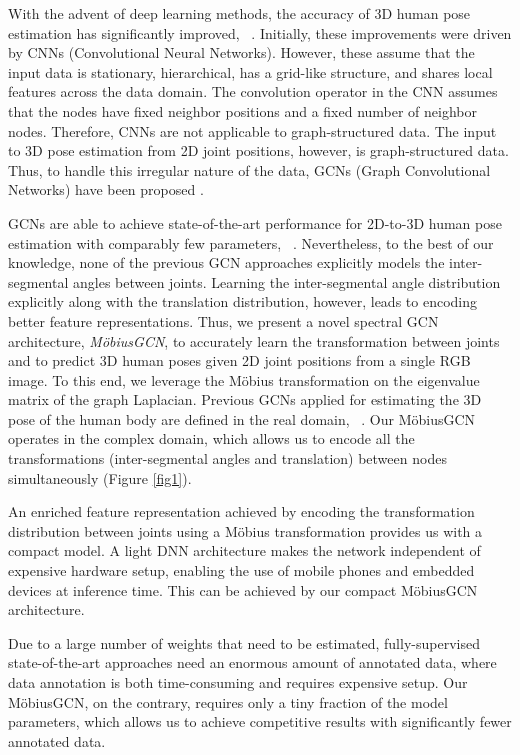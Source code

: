 \documentclass[runningheads]{llncs}
\begin{document}
With the advent of deep learning methods, the accuracy of 3D human pose estimation has significantly improved, \eg~\cite{martinez2017simple, pavllo20193d}. Initially, these improvements were driven by CNNs (Convolutional Neural Networks). 
However, these assume that the input data is stationary, hierarchical, has a grid-like structure, and shares local features across the data domain. The convolution operator in the CNN assumes that the nodes have fixed neighbor positions and a fixed number of neighbor nodes. Therefore, CNNs are not applicable to graph-structured data. The input to 3D pose estimation from 2D joint positions, however, is graph-structured data. Thus, to handle this irregular nature of the data, GCNs  (Graph Convolutional Networks) have been proposed \cite{bronstein2017geometric}.

GCNs are able to achieve state-of-the-art performance for 2D-to-3D human pose estimation with comparably few parameters, \eg~\cite{zhaoCVPR19semantic}. Nevertheless, to the best of our knowledge, none of the previous GCN approaches explicitly models the inter-segmental angles between joints. 
Learning the inter-segmental angle distribution explicitly along with the translation distribution, however, leads to encoding better feature representations.
Thus, we present a novel spectral GCN architecture, \emph{M\"obiusGCN}, to accurately learn the transformation between joints and to predict 3D human poses given 2D joint positions from a single RGB image. To this end, we leverage the M\"obius transformation on the eigenvalue matrix of the graph Laplacian. Previous GCNs applied for estimating the 3D pose of the human body are defined in the real domain, \eg~\cite{zhaoCVPR19semantic}.
Our M\"obiusGCN operates in the complex domain, which allows us to encode all the transformations (\ie inter-segmental angles and translation) between nodes simultaneously (Figure \ref{fig1}). 

An enriched feature representation achieved by encoding the transformation distribution between joints using a M\"obius transformation provides us with a compact model. A light DNN architecture makes the network independent of expensive hardware setup, enabling the use of mobile phones and embedded devices at inference time. This can be achieved by our compact M\"obiusGCN architecture.

Due to a large number of weights that need to be estimated, fully-supervised state-of-the-art approaches need an enormous amount of annotated data, where data annotation is both time-consuming and requires expensive setup. Our M\"obiusGCN, on the contrary, requires only a tiny fraction of the model parameters, which allows us to achieve competitive results with significantly fewer annotated data. 
\end{document}
